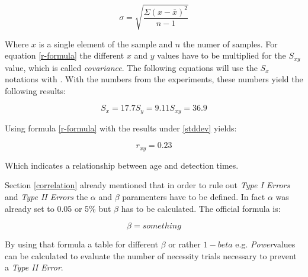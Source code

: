             \begin{equation}\label{stddev}
                \sigma = \sqrt{\frac{\Sigma(x-\bar{x})^{2}}{n-1}}
            \end{equation}            
            
            Where $x$ is a single element of the sample and $n$ the numer of samples. For equation \ref*{r-formula} the different $x$ and $y$ values have to be multiplied for the $S_{xy}$ value, which is called \textit{covariance}. The following equations will use the $S_{x}$ notations with . With the numbers from the experiments, these numbers yield the following results:

            \begin{equation}\label{stddev-results}
                S_{x} = 17.7
                S_{y} = 9.11
                S_{xy} = 36.9
            \end{equation} 
            
            Using formula \ref*{r-formula} with the results under \ref*{stddev} yields:

            \begin{equation}\label{r-value}
                r_{xy} = 0.23
            \end{equation}

            Which indicates a  relationship between age and detection times. 

            \medskip

            Section \ref*{correlation} already mentioned that in order to rule out \textit{Type I Errors} and \textit{Type II Errors} the $\alpha$ and $\beta$ paramenters have to be defined. In fact $\alpha$ was already set to 0.05 or 5\% but $\beta$ has to be calculated.
            The official formula is:

            \begin{equation}\label{beta-value}
                \beta = something
            \end{equation}


            \medskip

            By using that formula a table for different $\beta$ or rather $1-beta$ e.g. \textit{Power}values can be calculated to evaluate the number of necessity trials necessary to prevent a \textit{Type II Error}.

